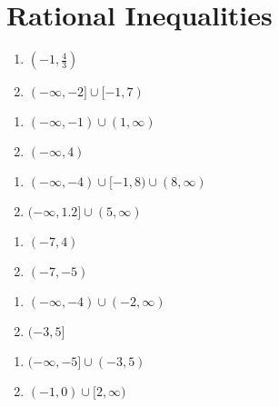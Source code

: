 \section*{Rational Inequalities}
\begin{multicols}{2}
\begin{enumerate}
    \item $\left(-1, \frac{4}{3}\right)$
    \item $(-\infty,-2] \cup [-1, 7)$
\end{enumerate} \setcounter{Review}{\value{enumi}}
\end{multicols}
\begin{multicols}{2}
\begin{enumerate}	\setcounter{enumi}{\value{Review}}
    \item $(-\infty, -1) \cup (1, \infty)$
    \item $(-\infty, 4)$
\end{enumerate} \setcounter{Review}{\value{enumi}}
\end{multicols}
\begin{multicols}{2}
\begin{enumerate}	\setcounter{enumi}{\value{Review}}
    \item $(-\infty, -4) \cup [-1, 8) \cup (8, \infty)$
    \item $(-\infty, 1.2] \cup (5, \infty)$
\end{enumerate} \setcounter{Review}{\value{enumi}}
\end{multicols}
\begin{multicols}{2}
\begin{enumerate}	\setcounter{enumi}{\value{Review}}
    \item $(-7, 4)$
    \item $(-7, -5)$
\end{enumerate} \setcounter{Review}{\value{enumi}}
\end{multicols}
\begin{multicols}{2}
\begin{enumerate}	\setcounter{enumi}{\value{Review}}
    \item $(-\infty, -4) \cup (-2, \infty)$
    \item $(-3, 5]$
\end{enumerate} \setcounter{Review}{\value{enumi}}
\end{multicols}
\begin{multicols}{2}
\begin{enumerate}	\setcounter{enumi}{\value{Review}}
    \item $(-\infty, -5] \cup (-3, 5)$
    \item $(-1, 0) \cup [2, \infty)$
\end{enumerate} \setcounter{Review}{\value{enumi}}
\end{multicols}

